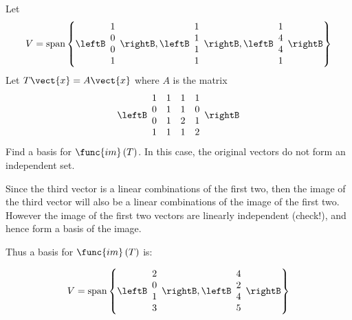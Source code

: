 \begin{enumialphparenastyle}
\begin{ex} Let 
\begin{equation*}
V=\mbox{span}\left\{ \leftB 
\begin{array}{c}
1 \\ 
0 \\ 
0 \\ 
1
\end{array}
\rightB ,\leftB 
\begin{array}{c}
1 \\ 
1 \\ 
1 \\ 
1
\end{array}
\rightB ,\leftB 
\begin{array}{c}
1 \\ 
4 \\ 
4 \\ 
1
\end{array}
\rightB \right\}
\end{equation*}
Let $T\vect{x}=A\vect{x}$ where $A$ is the matrix 
\begin{equation*}
\leftB 
\begin{array}{cccc}
1 & 1 & 1 & 1 \\ 
0 & 1 & 1 & 0 \\ 
0 & 1 & 2 & 1 \\ 
1 & 1 & 1 & 2
\end{array}
\rightB
\end{equation*}
Find a basis for $\func{im}\left( T\right) $. In this case, the original
vectors do not form an independent set.

\begin{sol}
Since the third vector is a linear combinations of the first two, then
the image of the third vector will also be a linear combinations of
the image of the first two.  However the image of the first two
vectors are linearly independent (check!), and hence form a basis of
the image.

Thus a basis for $\func{im}\left( T\right) $ is: 

\begin{equation*}
V=\mbox{span}\left\{ \leftB 
\begin{array}{c}
2 \\ 
0 \\ 
1 \\ 
3
\end{array}
\rightB ,\leftB 
\begin{array}{c}
4 \\ 
2 \\ 
4 \\ 
5
\end{array}
\rightB  \right\}
\end{equation*}


\end{sol}
\end{ex}
\end{enumialphparenastyle}
